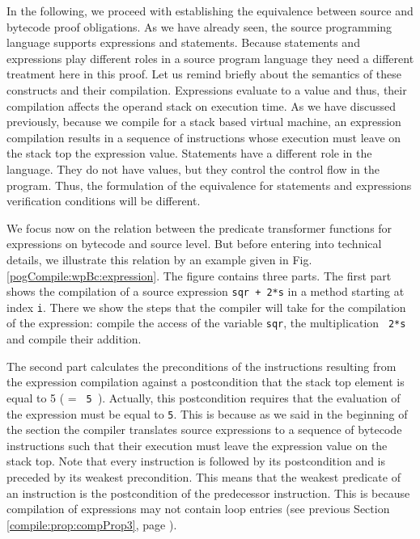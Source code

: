 \newtheorem{thm}{Theorem}[section]



 
In the following, we proceed with establishing the equivalence between source and bytecode 
proof obligations. As we have already seen, the source programming language supports 
expressions  and statements.  
 Because statements and expressions play different roles in  a source program language 
they need a different treatment here in this proof. Let us remind briefly about the semantics of these constructs and their compilation. 
Expressions evaluate to a value and thus, their compilation affects the operand stack on execution time. 
As we have discussed previously, because we compile for a stack based virtual machine,
an expression compilation   results in a sequence of instructions whose execution must leave on the stack top the expression value.
Statements have a different role in the language. They do not have values, but they control the control flow in the program. Thus,
 the formulation of the equivalence for statements and expressions verification conditions will be different.
   
We focus now on the relation between the \wpName{} predicate transformer functions for expressions 
on bytecode and source level. But before entering into technical details, we illustrate this relation
 by an example given in Fig.\ref{pogCompile:wpBc:expression}.
The figure contains three parts. The first part shows the compilation of a source expression \lstinline!sqr + 2*s! in a method \methodd{} starting at index \lstinline!i!.
There we show the steps that the compiler will take for the compilation of the expression: compile the access of the variable \lstinline!sqr!,
the multiplication  \lstinline! 2*s! and compile their addition. 

The second part calculates the preconditions of the instructions resulting from the 
 expression compilation against a postcondition that the stack top element is equal to 5 (\stack{\counter} = \lstinline! 5 !). 
Actually, this postcondition requires that the evaluation of the expression must be equal to \lstinline!5!. 
This is because as we said in the beginning of the section the compiler translates source expressions to a sequence of bytecode instructions
 such that their execution 
must leave the expression value on the stack top. 
Note that every instruction is followed by its postcondition and is preceded by its weakest  precondition.  This means that the weakest predicate of an instruction is the
postcondition of the predecessor instruction. This is because compilation of  expressions may not contain loop entries
 (see previous Section \ref{compile:prop:compProp3}, page \pageref{compile:prop:compProp3}).  

